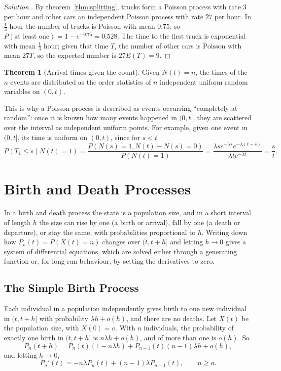 \documentclass[12pt,a4paper]{report}
\theoremstyle{definition}
\newtheorem{thm}{Theorem}[section]
\newenvironment{solution}
  {\renewcommand{\qedsymbol}{}\begin{proof}[\textit{Solution}.]}
  {\end{proof}}
\begin{document}
\begin{solution}
By theorem~\ref{thm:splitting}, trucks form a Poisson process with rate $3$ per hour and other
cars an independent Poisson process with rate $27$ per hour. In $\frac14$ hour the number of trucks
is Poisson with mean $0.75$, so $P(\text{at least one}) = 1 - e^{-0.75} = 0.528$. The time to the
first truck is exponential with mean $\frac13$ hour; given that time $T$, the number of other cars
is Poisson with mean $27T$, so the expected number is $27E(T) = 9$.
\end{solution}

\begin{thm}[Arrival times given the count]
\label{thm:ordered}
Given $N(t) = n$, the times of the $n$ events are distributed as the order statistics of $n$
independent uniform random variables on $(0, t)$.
\end{thm}

This is why a Poisson process is described as events occurring ``completely at random'': once
it is known how many events happened in $(0, t]$, they are scattered over the interval as
independent uniform points. For example, given one event in $(0, t]$, its time is uniform on
$(0, t)$, since for $s<t$
\[P(T_1\leq s\mid N(t) = 1) = \frac{P(N(s) = 1, N(t) - N(s) = 0)}{P(N(t) = 1)}
= \frac{\lambda se^{-\lambda s}e^{-\lambda(t - s)}}{\lambda te^{-\lambda t}} = \frac st .\]

\chapter{Birth and Death Processes}
\label{ch:birthdeath}

In a birth and death process the state is a population size, and in a short interval of length
$h$ the size can rise by one (a birth or arrival), fall by one (a death or departure), or stay
the same, with probabilities proportional to $h$. Writing down how $P_n(t) = P(X(t) = n)$ changes
over $(t, t + h]$ and letting $h\to 0$ gives a system of differential equations, which are solved
either through a generating function or, for long-run behaviour, by setting the derivatives to
zero.

\section{The Simple Birth Process}

Each individual in a population independently gives birth to one new individual in $(t, t + h]$
with probability $\lambda h + o(h)$, and there are no deaths. Let $X(t)$ be the population size,
with $X(0) = a$. With $n$ individuals, the probability of exactly one birth in $(t, t + h]$ is
$n\lambda h + o(h)$, and of more than one is $o(h)$. So
\[P_n(t + h) = P_n(t)(1 - n\lambda h) + P_{n-1}(t)(n - 1)\lambda h + o(h),\]
and letting $h\to 0$,
\begin{equation}
\label{eq:birthde}
P_n'(t) = -n\lambda P_n(t) + (n - 1)\lambda P_{n-1}(t),\qquad n\geq a .
\end{equation}
\end{document}
